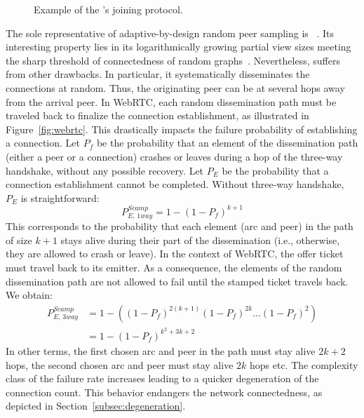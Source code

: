 \begin{figure*}
  \centering
  \hspace{8pt}
  \hspace{8pt}
  \caption{\label{fig:joiningexample}Example of the \SPRAY's joining
    protocol.}
\end{figure*}

The sole representative of adaptive-by-design random peer sampling is
\SCAMP~\cite{ganesh2001scamp,ganesh2003peer}. Its interesting property lies in
its logarithmically growing partial view sizes meeting the sharp threshold of
connectedness of random graphs~\cite{erdos1959random}. Nevertheless, \SCAMP
suffers from other drawbacks. In particular, it systematically disseminates the
connections at random. Thus, the originating peer can be at several hops away
from the arrival peer. In WebRTC, each random dissemination path must be
traveled back to finalize the connection establishment, as illustrated in
Figure~\ref{fig:webrtc}. This drastically impacts the \SCAMP failure
probability of establishing a connection.  Let $P_f$ be the probability that an
element of the dissemination path (either a peer or a connection) crashes or
leaves during a hop of the three-way handshake, without any possible
recovery. Let $P_E$ be the probability that a connection establishment cannot
be completed. Without three-way handshake, $P_E$ is straightforward:
\begin{equation} P_{E,\,1way}^{Scamp}=1-(1- P_f)^{k+1} \end{equation} This
corresponds to the probability that each element (arc and peer) in the path of
size $k+1$ stays alive during their part of the dissemination (i.e., otherwise,
they are allowed to crash or leave). In the context of WebRTC, the offer ticket must
travel back to its emitter. As a consequence, the elements of the random
dissemination path are not allowed to fail until the stamped ticket travels
back. We obtain:
\begin{align} P_{E,\,3way}^{Scamp} &=1 - ((1-P_f)^{2(k+1)} (1-P_f)^{2k}
                                     \ldots (1-P_f)^2) \nonumber \\
                                   &=1-(1-P_f)^{k^2+3k+2}
\end{align}
In other terms, the first chosen arc and peer in the path must stay alive
$2k+2$ hops, the second chosen arc and peer must stay alive $2k$ hops etc.  The
complexity class of the \SCAMP failure rate increases leading to a quicker
degeneration of the connection count. This behavior endangers the network
connectedness, as depicted in Section~\ref{subsec:degeneration}.

